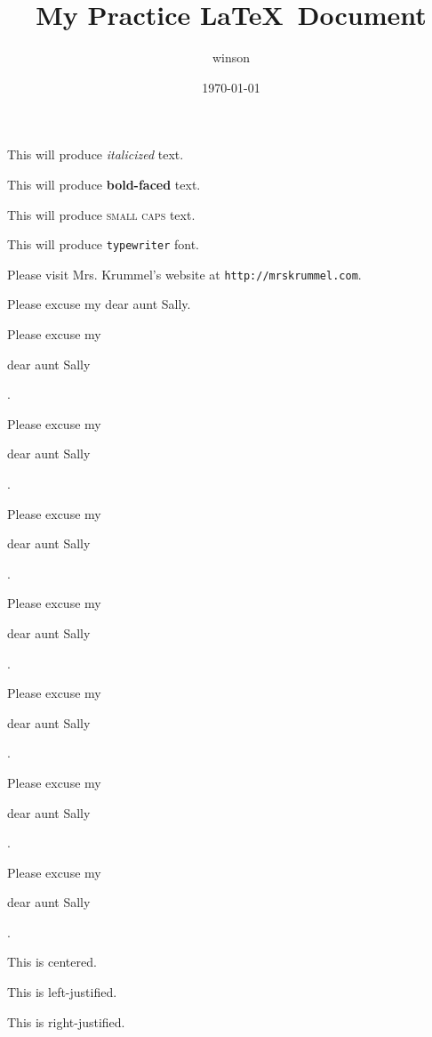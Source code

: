 \documentclass[11pt]{article}
\begin{document}
\tableofcontents

\title{My Practice \LaTeX\ Document}
\author{winson}
\date{\today}
\maketitle

This will produce \textit{italicized} text.

This will produce \textbf{bold-faced} text.

This will produce \textsc{small caps} text.

This will produce \texttt{typewriter} font.

Please visit Mrs. Krummel's website at
\texttt{http://mrskrummel.com}.

Please excuse my dear aunt Sally.

Please excuse my \begin{large}dear aunt Sally\end{large}.

Please excuse my \begin{Large}dear aunt Sally\end{Large}.

Please excuse my \begin{LARGE}dear aunt Sally\end{LARGE}.

Please excuse my \begin{huge}dear aunt Sally\end{huge}.

Please excuse my \begin{Huge}dear aunt Sally\end{Huge}.

Please excuse my \begin{small}dear aunt Sally\end{small}.

Please excuse my \begin{tiny}dear aunt Sally\end{tiny}.

\begin{center}This is centered.\end{center}

\begin{flushleft}This is left-justified.\end{flushleft}

\begin{flushright}This is right-justified.\end{flushright}
\end{document}

